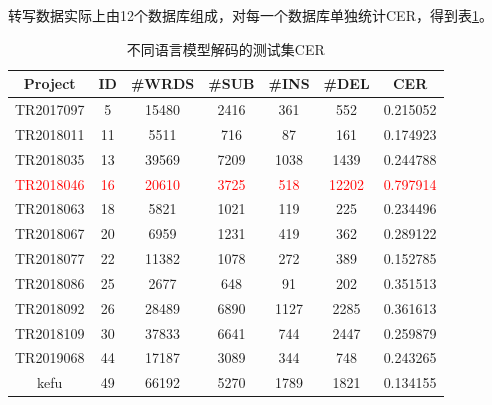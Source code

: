 转写数据实际上由12个数据库组成，对每一个数据库单独统计CER，得到表\ref{tab:cer-per}。
\begin{table}[h]
 \centering
 \caption{不同语言模型解码的测试集CER}
	 \begin{tabular*}{1\textwidth}{@{\extracolsep{\fill}}ccccccc}
	 \toprule
		{\bf Project   } & {\bf ID   } & {\bf #WRDS   } & {\bf #SUB    } & {\bf #INS    } & {\bf #DEL    } & {\bf CER  } \\
	 \midrule
		TR2017097  &          5 &      15480 &       2416 &        361 &        552 &   0.215052 \\
		TR2018011  &         11 &       5511 &        716 &         87 &        161 &   0.174923 \\
		TR2018035  &         13 &      39569 &       7209 &       1038 &       1439 &   0.244788 \\
		\textcolor{red}{TR2018046}  &         \textcolor{red}{16} &      \textcolor{red}{20610} &       \textcolor{red}{3725} &        \textcolor{red}{518} &      \textcolor{red}{12202} &   \textcolor{red}{0.797914} \\
		TR2018063  &         18 &       5821 &       1021 &        119 &        225 &   0.234496 \\
		TR2018067  &         20 &       6959 &       1231 &        419 &        362 &   0.289122 \\
		TR2018077  &         22 &      11382 &       1078 &        272 &        389 &   0.152785 \\
		TR2018086  &         25 &       2677 &        648 &         91 &        202 &   0.351513 \\
		TR2018092  &         26 &      28489 &       6890 &       1127 &       2285 &   0.361613 \\
		TR2018109  &         30 &      37833 &       6641 &        744 &       2447 &   0.259879 \\
		TR2019068  &         44 &      17187 &       3089 &        344 &        748 &   0.243265 \\
		kefu       &         49 &      66192 &       5270 &       1789 &       1821 &   0.134155 \\
	 \bottomrule
	 \end{tabular*}%
 \label{tab:cer-per}%
\end{table}%


